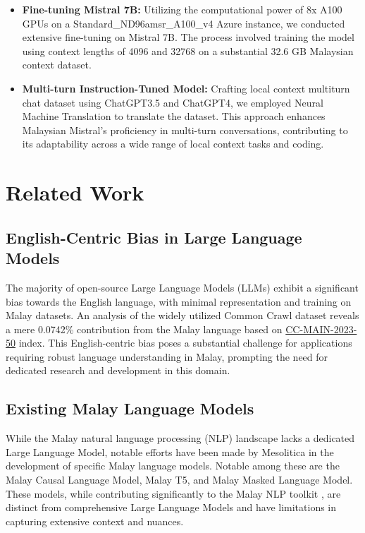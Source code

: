 \documentclass{article}
\begin{document}
\begin{itemize}
  \item \textbf{Fine-tuning Mistral 7B:} Utilizing the computational power of 8x A100 GPUs on a Standard\_ND96amsr\_A100\_v4 Azure instance, we conducted extensive fine-tuning on Mistral 7B. The process involved training the model using context lengths of 4096 and 32768 on a substantial 32.6 GB Malaysian context dataset.

  \item \textbf{Multi-turn Instruction-Tuned Model:} Crafting local context multiturn chat dataset using ChatGPT3.5 and ChatGPT4, we employed Neural Machine Translation to translate the dataset. This approach enhances Malaysian Mistral's proficiency in multi-turn conversations, contributing to its adaptability across a wide range of local context tasks and coding.
\end{itemize}

\section{Related Work}

\subsection{English-Centric Bias in Large Language Models}

The majority of open-source Large Language Models (LLMs) exhibit a significant bias towards the English language, with minimal representation and training on Malay datasets. An analysis of the widely utilized Common Crawl dataset reveals a mere 0.0742\% contribution from the Malay language based on \href{https://commoncrawl.github.io/cc-crawl-statistics/plots/languages}{CC-MAIN-2023-50} index. This English-centric bias poses a substantial challenge for applications requiring robust language understanding in Malay, prompting the need for dedicated research and development in this domain.

\subsection{Existing Malay Language Models}

While the Malay natural language processing (NLP) landscape lacks a dedicated Large Language Model, notable efforts have been made by Mesolitica in the development of specific Malay language models. Notable among these are the Malay Causal Language Model, Malay T5, and Malay Masked Language Model. These models, while contributing significantly to the Malay NLP toolkit \cite{Malaya}, are distinct from comprehensive Large Language Models and have limitations in capturing extensive context and nuances.
\end{document}
